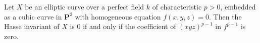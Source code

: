 Let $X$ be an elliptic curve over a perfect field $k$ of characteristic $p > 0$, embedded as a cubic curve in $\mathbf{P}^2$ with homogeneous equation $f(x,y,z) = 0$. Then the Hasse invariant of $X$ is $0$ if and only if the coefficient of $(xyz)^{p-1}$ in $f^{p-1}$ is zero.
